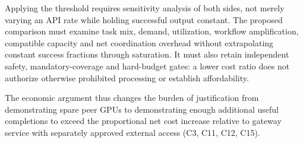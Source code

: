 \documentclass[11pt]{article}
\begin{document}
Applying the threshold requires sensitivity analysis of both sides, not merely varying an API rate while holding successful output constant. The proposed comparison must examine task mix, demand, utilization, workflow amplification, compatible capacity and net coordination overhead without extrapolating constant success fractions through saturation. It must also retain independent safety, mandatory-coverage and hard-budget gates: a lower cost ratio does not authorize otherwise prohibited processing or establish affordability.

The economic argument thus changes the burden of justification from demonstrating spare peer GPUs to demonstrating enough additional useful completions to exceed the proportional net cost increase relative to gateway service with separately approved external access (C3, C11, C12, C15).
\end{document}
